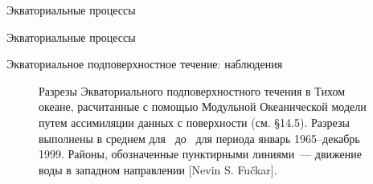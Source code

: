 \begin{chapter}{Экваториальные процессы}
\begin{section}{Экваториальные процессы}
\begin{paragraph}{Экваториальное подповерхностное течение: наблюдения}
\begin{figure}[t!]
\caption{Разрезы Экваториального подповерхностного течения в Тихом
океане, расчитанные с помощью Модульной Океанической модели путем
ассимиляции данных с поверхности (см. \S14.5). Разрезы выполнены в
среднем для~ до~ для периода январь
1965--декабрь 1999. Районы, обозначенные пунктирными линиями~---
движение воды в западном направлении [Nevin S. Fu\v{c}kar].}
\label{fig:equatorialxsec}
\end{figure}
%
%
\end{paragraph}


\end{section}
\end{chapter}
